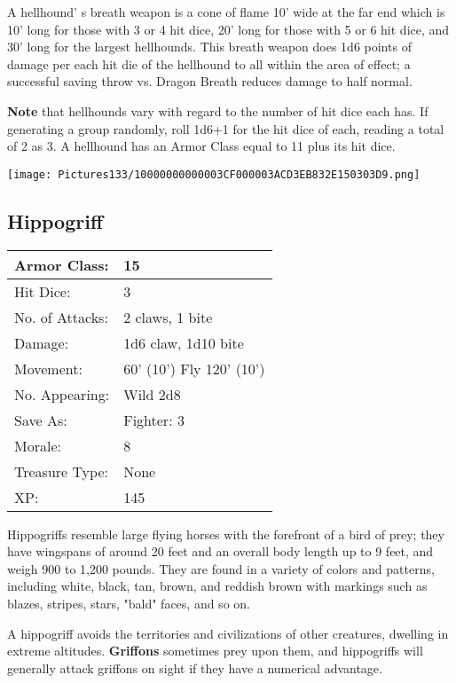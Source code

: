 \documentclass[a4paper,twoside,openany,10pt]{book}
\begin{document}
\begin{multicols}{2}
A hellhound' s breath weapon is a cone of flame 10' wide at the far end which is 10' long for those with 3 or 4 hit dice, 20' long for those with 5 or 6 hit dice, and 30' long for the largest hellhounds. This breath weapon does 1d6 points of damage per each hit die of the hellhound to all within the area of effect; a successful saving throw vs. Dragon Breath reduces damage to half normal. 

\textbf{Note} that hellhounds vary with regard to the number of hit dice each has. If generating a group randomly, roll 1d6+1 for the hit dice of each, reading a total of 2 as 3. A hellhound has an Armor Class equal to 11 plus its hit dice.


\begin{center}
	\texttt{[image: Pictures133/10000000000003CF000003ACD3EB832E150303D9.png]}
\end{center}

\subsection*{Hippogriff}\label{hippogriff}

\begin{tabularx}{0.48\textwidth}{@{}lX@{}}
Armor Class: & 15 \\\hline
Hit Dice: & 3 \\\hline
No. of Attacks: & 2 claws, 1 bite \\\hline
Damage: & 1d6 claw, 1d10 bite \\\hline
Movement: & 60' (10') Fly
120' (10') \\\hline
No. Appearing: & Wild 2d8 \\\hline
Save As: & Fighter: 3 \\\hline
Morale: & 8 \\\hline
Treasure Type: & None \\\hline
XP: & 145 \\\hline
\end{tabularx}\medskip

Hippogriffs resemble large flying horses with the forefront of a bird of prey; they have wingspans of around 20 feet and an overall body length up to 9 feet, and weigh 900 to 1,200 pounds. They are found in a variety of colors and patterns, including white, black, tan, brown, and reddish brown with markings such as blazes, stripes, stars, "bald" faces, and so on.

A hippogriff avoids the territories and civilizations of other creatures, dwelling in extreme altitudes. \textbf{Griffons} sometimes prey upon them, and hippogriffs will generally attack griffons on sight if they have a numerical advantage.


\end{multicols}
\end{document}
